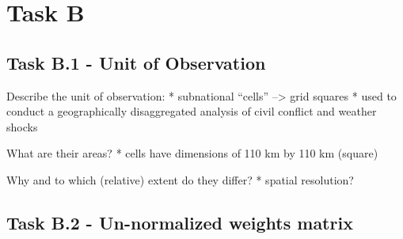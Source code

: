 \documentclass[
  a4paper,
]{article}
\begin{document}
\newpage

\hypertarget{task-b}{%
\section{Task B}\label{task-b}}

\hypertarget{task-b.1---unit-of-observation}{%
\subsection{Task B.1 - Unit of
Observation}\label{task-b.1---unit-of-observation}}

Describe the unit of observation: * subnational ``cells''
--\textgreater{} grid squares * used to conduct a geographically
disaggregated analysis of civil conflict and weather shocks

What are their areas? * cells have dimensions of 110 km by 110 km
(square)

Why and to which (relative) extent do they differ? * spatial resolution?

\hypertarget{task-b.2---un-normalized-weights-matrix}{%
\subsection{Task B.2 - Un-normalized weights
matrix}\label{task-b.2---un-normalized-weights-matrix}}

\newpage

\printbibliography
\end{document}
